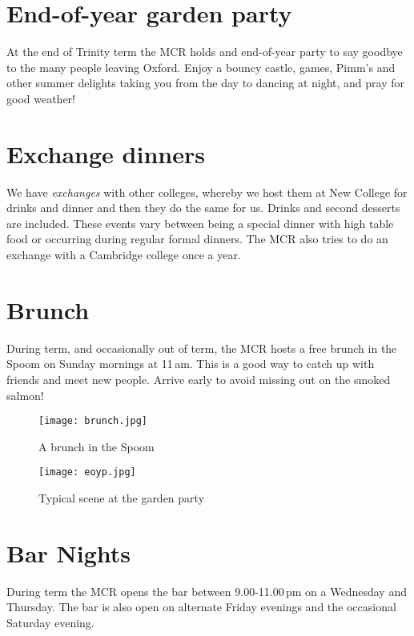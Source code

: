 \section{End-of-year garden party} 
At the end of Trinity term the MCR holds and end-of-year party to say goodbye to the many people leaving Oxford. Enjoy a bouncy castle, games, Pimm's and other summer delights taking you from the day to dancing at night, and pray for good weather! 

\section{Exchange dinners}
We have \emph{exchanges} with other colleges, whereby we host them at New
College for drinks and dinner and then they do the same for us. Drinks and second desserts are included. These events vary between being a special dinner with high table food or occurring during regular formal dinners. The MCR also tries to do an exchange with a Cambridge college once a year. 

\section{Brunch}
During term, and occasionally out of term, the MCR hosts a free brunch in the
Spoom on Sunday mornings at 11\,am. This is a good way to catch up with friends and meet new people. Arrive early to avoid missing out on the smoked salmon!

\begin{figure}[htbp]
\centering
		\begin{minipage}{0.45\textwidth}
			\centering
				\texttt{[image: brunch.jpg]}
				\caption[]{A brunch in the Spoom}
                \label{fig:brunch}
        \end{minipage}%
        \quad
        \begin{minipage}{0.45\textwidth}
        	\centering
				\texttt{[image: eoyp.jpg]}
				\caption[]{Typical scene at the
				garden party}
				\label{fig:eoyp}
        \end{minipage}%
\end{figure}

\section{Bar Nights}
During term the MCR opens the bar between 9.00-11.00\,pm on a Wednesday and
Thursday. The bar is also open on alternate Friday evenings and the occasional Saturday evening.


